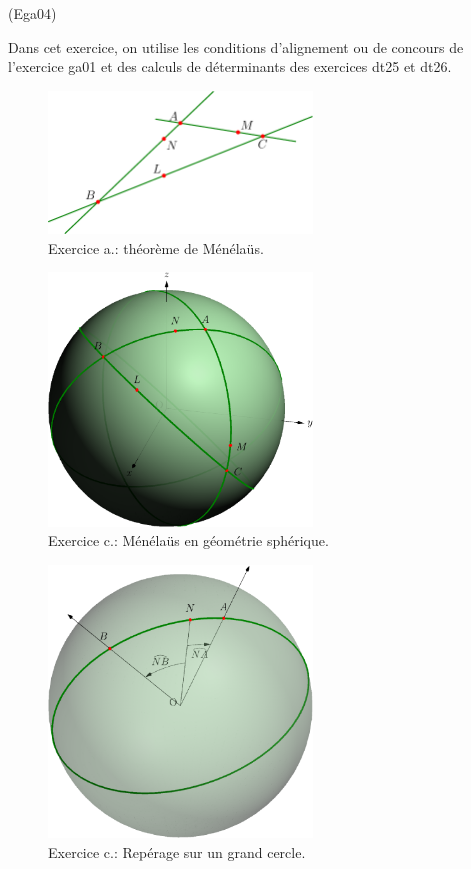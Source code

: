\begin{tiny}(Ega04)\end{tiny}
Dans cet exercice, on utilise les conditions d'alignement ou de concours de l'exercice ga01 et des calculs de déterminants des exercices dt25 et dt26. 
\begin{figure}[h!]
  \centering
  \includegraphics[width=7cm]{Ega04_1.pdf}
  \caption{Exercice  a.: théorème de Ménéla{\"u}s.}
  \label{fig:Ega04_1}
\end{figure}

\begin{figure}[h!]
  \centering
  \includegraphics[width=7cm]{Ega04_2.eps}
  \caption{Exercice  c.: Ménéla{\"u}s en géométrie sphérique.}
  \label{fig:Ega04_2}
\end{figure}

\begin{figure}[h!]
  \centering
  \includegraphics[width=7cm]{Ega04_3.eps}
  \caption{Exercice  c.: Repérage sur un grand cercle.}
  \label{fig:Ega04_3}
\end{figure}

